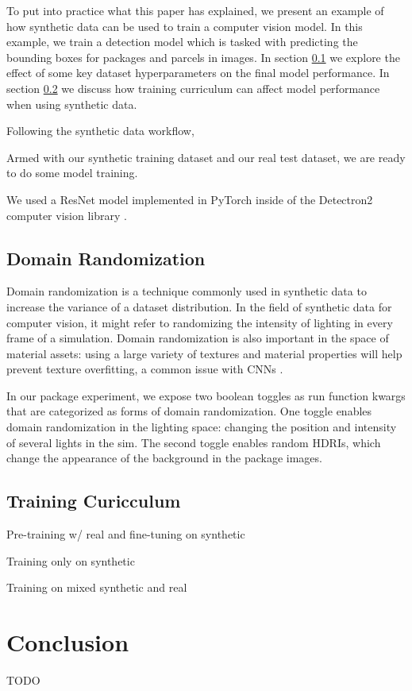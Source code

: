 \documentclass{article}
\begin{document}
To put into practice what this paper has explained, we present an example of how synthetic data can be used to train a computer vision model. In this example, we train a detection model which is tasked with predicting the bounding boxes for packages and parcels in images. In section \ref{sec:domainrandomization} we explore the effect of some key dataset hyperparameters on the final model performance. In section \ref{sec:curicculum} we discuss how training curriculum can affect model performance when using synthetic data.

Following the synthetic data workflow,

Armed with our synthetic training dataset and our real test dataset, we are ready to do some model training.

We used a ResNet model implemented in PyTorch inside of the Detectron2 computer vision library \cite{wu2019detectron2}.


\subsection{Domain Randomization}
\label{sec:domainrandomization}

Domain randomization is a technique commonly used in synthetic data to increase the variance of a dataset distribution. In the field of synthetic data for computer vision, it might refer to randomizing the intensity of lighting in every frame of a simulation. Domain randomization is also important in the space of material assets: using a large variety of textures and material properties will help prevent texture overfitting, a common issue with CNNs \cite{DBLP:journals/corr/abs-1811-12231}. 

In our package experiment, we expose two boolean toggles as run function kwargs that are categorized as forms of domain randomization. One toggle enables domain randomization in the lighting space: changing the position and intensity of several lights in the sim. The second toggle enables random HDRIs, which change the appearance of the background in the package images.

\subsection{Training Curicculum}
\label{sec:curicculum}

Pre-training w/ real and fine-tuning on synthetic

Training only on synthetic

Training on mixed synthetic and real

\section{Conclusion}
\label{sec:conclusion}

TODO

% 
% 
\printbibliography
\end{document}
